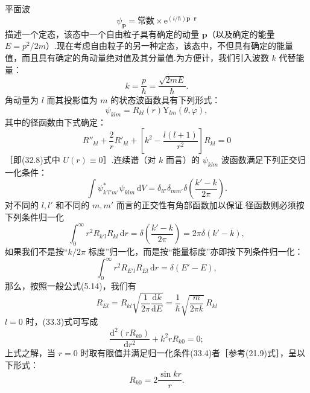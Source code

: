 平面波
\begin{equation*}
  \psi_{\boldsymbol{p}}=\text{常数}\times\mathrm{e}^{(i/\hbar)\boldsymbol{p}\cdot\boldsymbol{r}}
\end{equation*}
描述一个定态，该态中一个自由粒子具有确定的动量 $\boldsymbol{p}$（以及确定的能量 $E=p^2/2m$）.现在考虑自由粒子的另一种定态，该态中，不但具有确定的能量值，而且具有确定的角动量绝对值及其分量值.为方便计，我们引入波数 $k$ 代替能量：
\begin{equation}
  k=\frac{p}{\hbar}=\frac{\sqrt{2mE}}{\hbar}.
\end{equation}
角动量为 $l$ 而其投影值为 $m$ 的状态波函数具有下列形式：
\begin{equation}
  \psi_{klm}=R_{kl}(r)\mathrm{Y}_{lm}(\theta,\varphi),
\end{equation}
其中的径函数由下式确定：
\begin{equation}
  R''_{kl}+\frac{2}{r}R'_{kl}+\left[k^2-\frac{l(l+1)}{r^2}\right]R_{kl}=0
\end{equation}
［即(32.8)式中 $U(r)\equiv0$］.连续谱（对 $k$ 而言）的 $\psi_{klm}$ 波函数满足下列正交归一化条件：
\begin{equation*}
  \int\psi^*_{k'l'm'}\psi_{klm}\,\mathrm{d}V
  =\delta_{ll'}\delta_{mm'}\delta\left(\frac{k'-k}{2\pi}\right).
\end{equation*}
对不同的 $l,l'$ 和不同的 $m,m'$ 而言的正交性有角部函数加以保证.径函数则必须按下列条件归一化
\begin{equation}
  \int_0^{\infty}r^2R_{k'l}R_{kl}\,\mathrm{d}r
  =\delta\left(\frac{k'-k}{2\pi}\right)=2\pi\delta(k'-k),
\end{equation}
如果我们不是按“$k/2\pi$ 标度”归一化，而是按“能量标度”亦即按下列条件归一化：
\begin{equation*}
  \int_0^{\infty}r^2R_{E'l}R_{El}\,\mathrm{d}r=\delta(E'-E),
\end{equation*}
那么，按照一般公式(5.14)，我们有
\begin{equation}
  R_{El}=R_{kl}\sqrt{\frac{1}{2\pi}\frac{\mathrm{d}k}{\mathrm{d}E}}
  =\frac{1}{\hbar}\sqrt{\frac{m}{2\pi k}}\,R_{kl}
\end{equation}
$l=0$ 时，(33.3)式可写成
\begin{equation*}
  \frac{\mathrm{d}^2(rR_{k0})}{\mathrm{d}r^2}+k^2rR_{k0}=0;
\end{equation*}
上式之解，当 $r=0$ 时取有限值并满足归一化条件(33.4)者［参考(21.9)式］，呈以下形式：
\begin{equation}
  R_{k0}=2\frac{\sin kr}{r}.
\end{equation}
